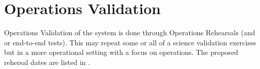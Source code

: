 
\section{Operations Validation}
 Operations Validation of the system is done through Operations Rehearsals (and or end-to-end tests).
 This may repeat some or all of a science validation exercises but in a more operational setting with a focus on operations. The proposed rehersal dates are listed in .


